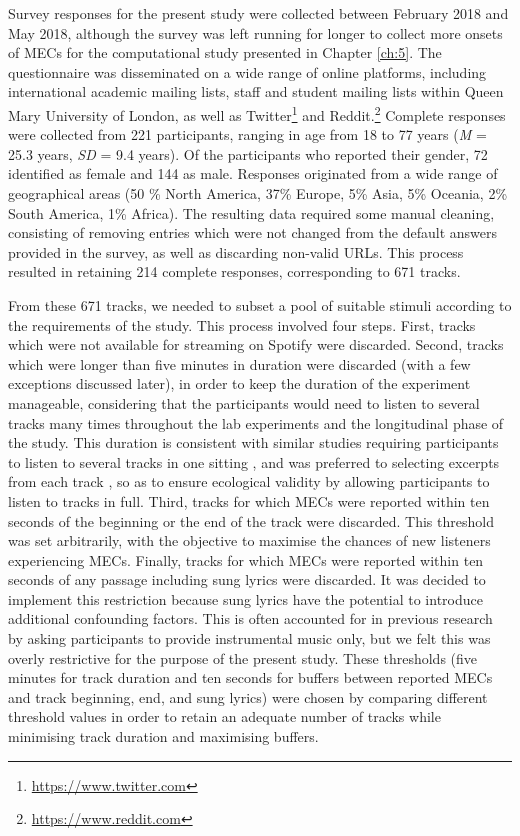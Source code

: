 Survey responses for the present study were collected between February 2018 and May 2018, although the survey was left running for longer to collect more onsets of MECs for the computational study presented in Chapter \ref{ch:5}. The questionnaire was disseminated on a wide range of online platforms, including international academic mailing lists, staff and student mailing lists within Queen Mary University of London, as well as Twitter\footnote{\url{https://www.twitter.com}} and Reddit.\footnote{\url{https://www.reddit.com}} Complete responses were collected from 221 participants, ranging in age from 18 to 77 years (\emph{M} = 25.3 years, \emph{SD} = 9.4 years). Of the participants who reported their gender, 72 identified as female and 144 as male. Responses originated from a wide range of geographical areas (50 \% North America, 37\% Europe, 5\% Asia, 5\% Oceania, 2\% South America, 1\% Africa). The resulting data required some manual cleaning, consisting of removing entries which were not changed from the default answers provided in the survey, as well as discarding non-valid URLs. This process resulted in retaining 214 complete responses, corresponding to 671 tracks.

From these 671 tracks, we needed to subset a pool of suitable stimuli according to the requirements of the study. This process involved four steps. First, tracks which were not available for streaming on Spotify were discarded. Second, tracks which were longer than five minutes in duration were discarded (with a few exceptions discussed later), in order to keep the duration of the experiment manageable, considering that the participants would need to listen to several tracks many times throughout the lab experiments and the longitudinal phase of the study. This duration is consistent with similar studies requiring participants to listen to several tracks in one sitting \parencite{laeng2016,mori2014b}, and was preferred to selecting excerpts from each track \parencite{blood2001,sachs2016,salimpoor2009}, so as to ensure ecological validity by allowing participants to listen to tracks in full. Third, tracks for which MECs were reported within ten seconds of the beginning or the end of the track were discarded. This threshold was set arbitrarily, with the objective to maximise the chances of new listeners experiencing MECs. Finally, tracks for which MECs were reported within ten seconds of any passage including sung lyrics were discarded. It was decided to implement this restriction because sung lyrics have the potential to introduce additional confounding factors. This is often accounted for in previous research by asking participants to provide instrumental music only, but we felt this was overly restrictive for the purpose of the present study. These thresholds (five minutes for track duration and ten seconds for buffers between reported MECs and track beginning, end, and sung lyrics) were chosen by comparing different threshold values in order to retain an adequate number of tracks while minimising track duration and maximising buffers.

